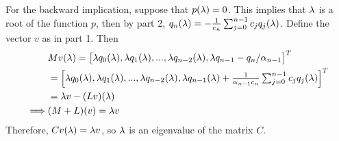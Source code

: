 \begin{solution}
    For the backward implication, suppose that $p(\mathrm{\lambda}) = 0$. This implies that $\mathrm{\lambda}$ is a root of the function $p$, then by part 2, $q_n(\mathrm{\lambda}) = -\frac{1}{c_n}\sum_{j = 0}^{n-1}c_jq_j(\mathrm{\lambda})$. Define the vector $v$ as in part 1. Then
    \begin{align*}
        &Mv(\lm) = \mqty[\lm q_0(\lm), \lm q_1(\lm ), ..., \lm q_{n-2}(\lm ), \lm q_{n - 1} - q_n / \alpha_{n-1}]^T\\
        &= \mqty[\lm q_0(\lm), \lm q_1(\lm ), ..., \lm q_{n-2}(\lm ), \lm q_{n - 1}(\lm) +\frac{1}{\alpha_{n-1}c_n}\sum_{j = 0}^{n-1}c_jq_j(\lm) ]^T\\
        &= \lm v - (Lv)(\lm)\\
        \implies &(M+L)(v) = \lm v
    \end{align*}
    Therefore, $Cv(\mathrm{\lambda}) = \mathrm{\lambda} v $, so $\mathrm{\lambda}$ is an eigenvalue of the matrix $C$. 
\end{solution}

\newpage
